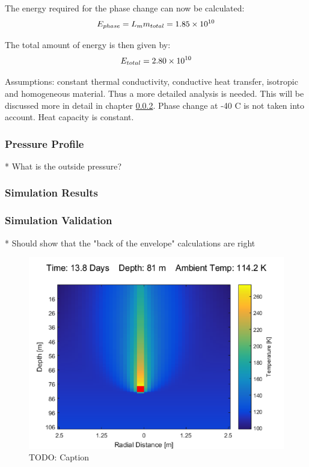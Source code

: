 The energy required for the phase change can now be calculated:
\begin{equation}
	E_{phase} = L_m m_{total} = 1.85 \times 10^{10}
\end{equation}

The total amount of energy is then given by:
\begin{equation}
	E_{total} = 2.80 \times 10^{10}
\end{equation}

\newpage
Assumptions: constant thermal conductivity, conductive heat transfer, isotropic and homogeneous material. Thus a more detailed analysis is needed. This will be discussed more in detail in chapter \ref{sec:temp_simulation}. Phase change at -40 C is not taken into account. Heat capacity is constant.

\subsubsection{Pressure Profile}

* What is the outside pressure?

\subsubsection{Simulation Results}\label{sec:temp_simulation}

\subsubsection{Simulation Validation}

* Should show that the "back of the envelope" calculations are right

\begin{figure}[htb]
	\centering
	\includegraphics[width=\textwidth]{figures/temperature/temperature_simulation}
	\caption{TODO: Caption}
	\label{fig:temperature_simulation}
\end{figure}

